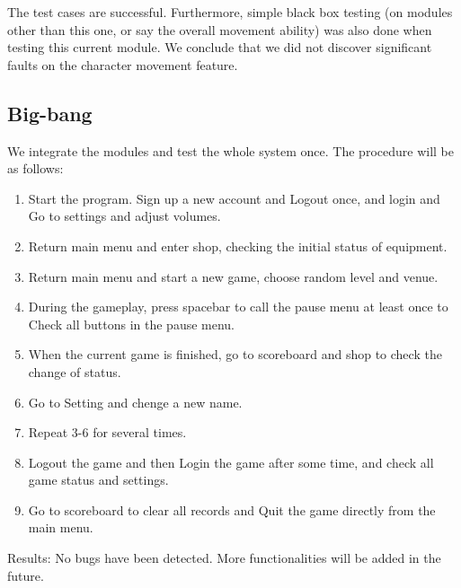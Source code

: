 \documentclass[11pt]{article}
\begin{document}
    The test cases are successful. Furthermore, simple black box testing (on modules other than this one, or say the overall movement ability) was also done when testing this current module. We conclude that we did not discover significant faults on the character movement feature.
    
    \subsection{Big-bang}

    We integrate the modules and test the whole system once. The procedure will be as follows:

    \begin{enumerate}
        \item Start the program. Sign up a new account and Logout once, and login and Go to settings and adjust volumes.
        \item Return main menu and enter shop, checking the initial status of equipment.
        \item Return main menu and start a new game, choose random level and venue.
        \item During the gameplay, press spacebar to call the pause menu at least once to Check all buttons in the pause menu.
        \item When the current game is finished, go to scoreboard and shop to check the change of status.
        \item Go to Setting and chenge a new name.
        \item Repeat 3-6 for several times.
        \item Logout the game and then Login the game after some time, and check all game status and settings.
        \item Go to scoreboard to clear all records and Quit the game directly from the main menu.
    \end{enumerate}

    Results: No bugs have been detected. More functionalities will be added in the future.
\end{document}
